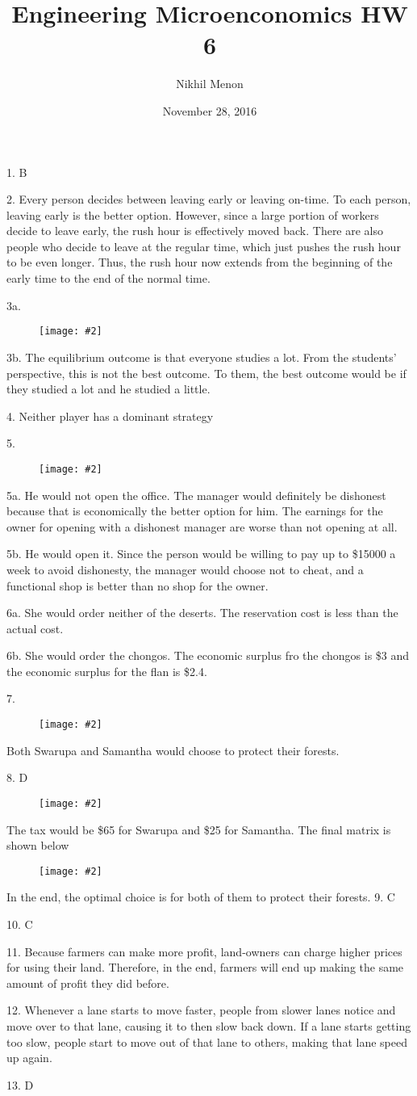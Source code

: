 \documentclass{article}
\title{Engineering Microenconomics HW 6}
\author{Nikhil Menon}
\date{November 28, 2016}
\newcommand{\makefig}[2]{
\begin{figure}[h!]
\centering
\texttt{[image: \#2]}
\end{figure}
}
\begin{document}
\maketitle

1. B

2. Every person decides between leaving early or leaving on-time. To each person, leaving early is the better option. However, since a large portion of workers decide to leave early, the rush hour is effectively moved back. There are also people who decide to leave at the regular time, which just pushes the rush hour to be even longer. Thus, the rush hour now extends from the beginning of the early time to the end of the normal time.

3a. \makefig{0.9}{P3.png}

3b. The equilibrium outcome is that everyone studies a lot. From the students' perspective, this is not the best outcome. To them, the best outcome would be if they studied a lot and he studied a little. 

4. Neither player has a dominant strategy

5. \makefig{0.9}{P5.png}

5a. He would not open the office. The manager would definitely be dishonest because that is economically the better option for him. The earnings for the owner for opening with a dishonest manager are worse than not opening at all.

5b. He would open it. Since the person would be willing to pay up to \$15000 a week to avoid dishonesty, the manager would choose not to cheat, and a functional shop is better than no shop for the owner.

6a. She would order neither of the deserts. The reservation cost is less than the actual cost.

6b. She would order the chongos. The economic surplus fro the chongos is \$3 and the economic surplus for the flan is \$2.4.

7. \makefig{0.8}{P7.png}

Both Swarupa and Samantha would choose to protect their forests.

8. D

\makefig{0.8}{P8.png} 

The tax would be \$65 for Swarupa and \$25 for Samantha. The final matrix is shown below

\makefig{0.8}{P8b.png}

In the end, the optimal choice is for both of them to protect their forests.
9. C

10. C

11. Because farmers can make more profit, land-owners can charge higher prices for using their land. Therefore, in the end, farmers will end up making the same amount of profit they did before.

12. Whenever a lane starts to move faster, people from slower lanes notice and move over to that lane, causing it to then slow back down. If a lane starts getting too slow, people start to move out of that lane to others, making that lane speed up again.

13. D


 
\end{document}
